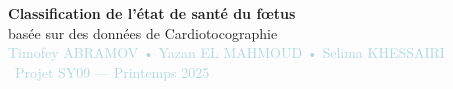 \documentclass[a0,landscape]{a0poster}
\begin{document}
\begin{tcolorbox}[
  colback=darkblue,
  coltext=white,
  arc=0mm,
  boxrule=0pt,
  left=20pt,
  right=20pt,
  top=15pt,
  bottom=15pt
]
\begin{center}
  {\Huge\sffamily\bfseries Classification de l'état de santé du fœtus}\\[0.3cm]
  {\LARGE\sffamily basée sur des données de Cardiotocographie}\\[0.8cm]
  {\Large\sffamily\textcolor{lightblue}{Timofey ABRAMOV \quad • \quad Yazan EL MAHMOUD \quad • \quad Selima KHESSAIRI}}\\[0.3cm]
  {\large\sffamily\textcolor{lightblue}{\faUniversity\ Projet SY09 — Printemps 2025}}
\end{center}
\end{tcolorbox}

\vspace{0.8cm}
\end{document}
